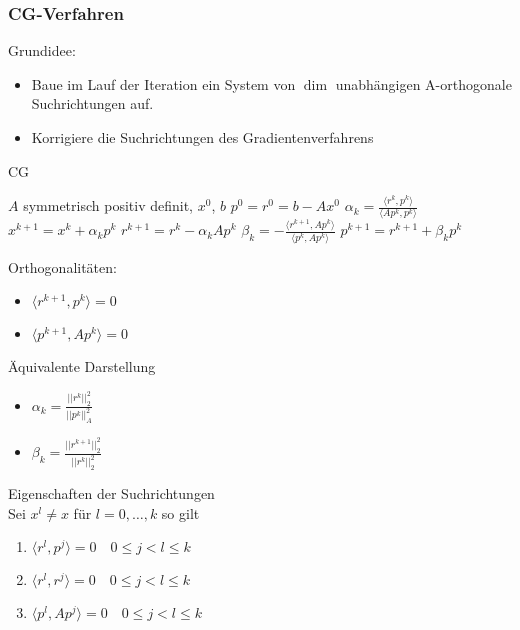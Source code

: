 \subsubsection{CG-Verfahren}
Grundidee:
\begin{itemize}
	\item Baue im Lauf der Iteration ein System von $\dim$ unabhängigen A-orthogonale Suchrichtungen auf.
	\item Korrigiere die Suchrichtungen des Gradientenverfahrens
\end{itemize}

\begin{algorithm}
	\caption{CG}
	\begin{algorithmic}
		\STATE $A$ symmetrisch positiv definit, $x^{0}$, $b$
		\STATE $p^{0} = r^{0} = b- Ax^{0}$
			\STATE $\alpha_{k}=\frac{\langle r^{k},p^{k}\rangle}{\langle A p^{k},p^{k}\rangle}$
			\STATE $x^{k+1} =  x^{k} + \alpha_{k} p^{k}$
			\STATE $r^{k+1} = r^{k} - \alpha_{k}Ap^{k}$
			\STATE $\beta_{k} = - \frac{\langle r^{k+1},Ap^{k}\rangle}{\langle p^{k},Ap^{k}\rangle}$
			\STATE $p^{k+1} = r^{k+1} + \beta_{k}p^{k}$
		\ENDFOR
	\end{algorithmic}
\end{algorithm}

\begin{remark}
	Orthogonalitäten:
	\begin{itemize}
		\item $\langle r^{k+1}, p^{k}\rangle=0$
		\item $\langle p^{k+1},Ap^{k}\rangle=0$
	\end{itemize}
\end{remark}

\begin{theorem}
	Äquivalente Darstellung
	\\
	\begin{itemize}
		\item $\alpha_{k}=\frac{||r^{k}||_{2}^{2}}{||p^{k}||_{A}^{2}}$
		\item $\beta_{k} = \frac{||r^{k+1}||^{2}_{2}}{||r^{k}||^{2}_{2}}$
	\end{itemize}
\end{theorem}


\begin{theorem}
	Eigenschaften der Suchrichtungen
	\\
	Sei $x^{l}\not = x$ für $l=0,\ldots,k$ so gilt
	\begin{enumerate}
		\item $\langle r^{l},p^{j}\rangle=0\quad 0\leq j<l\leq k$
		\item $\langle r^{l},r^{j}\rangle=0\quad 0\leq j<l\leq k$
		\item $\langle p^{l},Ap^{j}\rangle =0 \quad 0\leq j<l\leq k$
	\end{enumerate}
\end{theorem}


